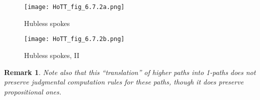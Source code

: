 \documentclass[12pt]{article}
\newcounter{mathcount}
\newtheorem{prermk}{Remark}
\newenvironment{rmk}{\begin{prermk}}{\end{prermk}\addtocounter{mathcount}{1}}
\begin{document}
\begin{figure}
  \centering
  \begin{minipage}{2in}
  \texttt{[image: HoTT\_fig\_6.7.2a.png]}
    \caption{Hubless spokes}
    \label{fig:spokes-no-hub}
  \end{minipage}
  \qquad
  \begin{minipage}{2in}
  \texttt{[image: HoTT\_fig\_6.7.2b.png]}
    \caption{Hubless spokes, II}
    \label{fig:spokes-no-hub-ii}
  \end{minipage}
\end{figure}

\begin{rmk}
  Note also that this ``translation'' of higher paths into 1-paths does not preserve judgmental computation rules for these paths, though it does preserve propositional ones.
\end{rmk}

%
%

%
\end{document}
